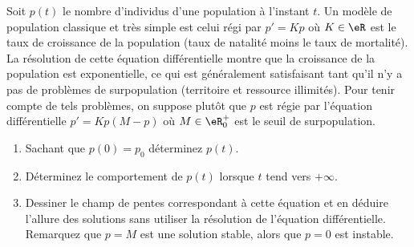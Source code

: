 
\begin{exercice}\label{exoEqsDiff0005}

Soit $p(t)$ le nombre d'individus d'une population à l'instant $t$. Un modèle de population classique et très simple est celui régi par $p' = K p$ où $K \in \eR$ est le taux de croissance de la population (taux de natalité moins le taux de mortalité). La résolution de cette équation différentielle montre que la croissance de la population est exponentielle, ce qui est généralement satisfaisant tant qu'il n'y a pas de problèmes de surpopulation (territoire et ressource illimités).  Pour tenir compte de tels problèmes, on suppose plutôt que $p$ est régie par l'équation différentielle $p' = Kp(M-p)$ où $M \in \eR_0^+$ est le seuil de surpopulation.
\begin{enumerate}
\item
Sachant que $p(0) = p_0$ déterminez $p(t)$.
\item
Déterminez le comportement de $p(t)$ lorsque $t$ tend vers $+\infty $.
\item
Dessiner le champ de pentes correspondant à cette équation et en déduire l'allure des solutions sans utiliser la résolution de l'équation différentielle. Remarquez que $p=M$ est une solution stable, alors que $p=0$ est instable.
\end{enumerate}

\end{exercice}
